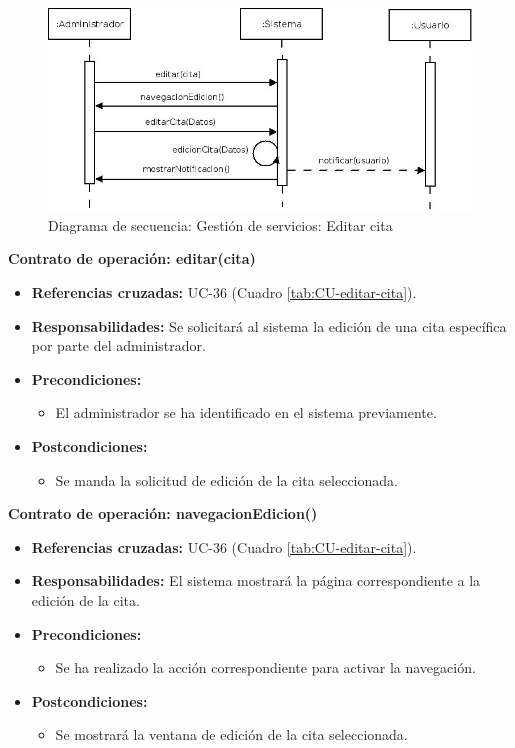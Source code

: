 \begin{figure}[H]
\centering
  \includegraphics[scale=.50]{img/secuencias/gestion-servicios-editar-cita.jpeg}
  \caption{Diagrama de secuencia: Gestión de servicios: Editar cita}
  \label{fig:secuencia-gestion-servicios-editar-cita}
\end{figure}

\textbf{Contrato de operación: editar(cita)}
\begin{itemize}
\item \textbf{Referencias cruzadas:} UC-36 (Cuadro \ref{tab:CU-editar-cita}).
\item \textbf{Responsabilidades:} Se solicitará al sistema la edición de una cita específica por parte del administrador.
\item \textbf{Precondiciones:} 
 \begin{itemize}
\item El administrador se ha identificado en el sistema previamente.
\end {itemize}
\item \textbf{Postcondiciones:} 
 \begin{itemize}
\item Se manda la solicitud de edición de la cita seleccionada.
\end {itemize}
\end {itemize}

\textbf{Contrato de operación: navegacionEdicion()}
\begin{itemize}
\item \textbf{Referencias cruzadas:} UC-36 (Cuadro \ref{tab:CU-editar-cita}).
\item \textbf{Responsabilidades:} El sistema mostrará la página correspondiente a la edición de la cita.
\item \textbf{Precondiciones:} 
 \begin{itemize}
\item Se ha realizado la acción correspondiente para activar la navegación.
\end {itemize}
\item \textbf{Postcondiciones:} 
 \begin{itemize}
\item Se mostrará la ventana de edición de la cita seleccionada.
\end {itemize}
\end {itemize}

